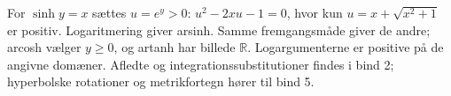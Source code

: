 



For $\sinh y=x$ sættes $u=e^y>0$: $u^2-2xu-1=0$, hvor kun
$u=x+\sqrt{x^2+1}$ er positiv. Logaritmering giver arsinh.
Samme fremgangsmåde giver de andre; arcosh vælger $y\ge0$, og artanh
har billede $\mathbb R$. Logargumenterne er positive på de angivne domæner.
Afledte og integrationssubstitutioner findes i bind 2; hyperbolske
rotationer og metrikfortegn hører til bind 5.
